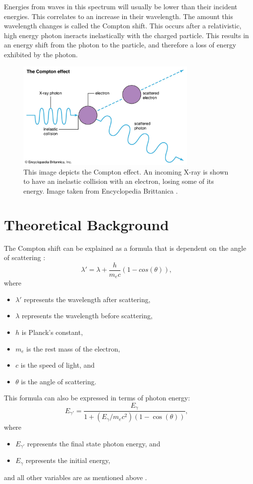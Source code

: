 \documentclass[10pt,letterpaper,onecolumn]{article}
\begin{document}
Energies from waves in this spectrum will usually be lower than their incident energies. This correlates to an increase in their wavelength. The amount this wavelength changes is called the Compton shift. This occurs after a relativistic, high energy photon ineracts inelastically with the charged particle. This results in an energy shift from the photon to the particle, and therefore a loss of energy exhibited by the photon.\cite{Pattison1975}
\begin{figure}
    \begin{center}
        \includegraphics*[width=3.5in]{scattering.jpg}
        \caption{This image depicts the Compton effect. An incoming X-ray is shown to have an inelastic collision with an electron, losing some of its energy. Image taken from Encyclopedia Brittanica \cite{ComptonEffectImage}.}
    \end{center}
\end{figure}
\section{Theoretical Background}
The Compton shift can be explained as a formula that is dependent on the angle of scattering \cite{PhysRev.21.483}:
\begin{equation}
    \label{comptonShiftWavelength} 
    \lambda' = \lambda + \frac{h}{m_e c}(1 - cos(\theta)),
\end{equation}
where 
\begin{itemize}
\item $\lambda'$ represents the wavelength after scattering, 
\item $\lambda$ represents the wavelength before scattering, 
\item $h$ is Planck's constant,
\item $m_e$ is the rest mass of the electron,
\item $c$ is the speed of light, and
\item $\theta$ is the angle of scattering.
\end{itemize}
This formula can also be expressed in terms of photon energy:
\begin{equation}
    \label{comptonShiftEnergy} 
    E_{\gamma'} = \frac{E_{\gamma}}{1 + \left( {E_{\gamma}}/{m_e c^2} \right)(1 - \cos(\theta))},
\end{equation}
where 
\begin{itemize}
\item $ E_{\gamma'}$ represents the final state photon energy, and
\item $E_{\gamma}$ represents the initial energy, 
\end{itemize}
and all other variables are as mentioned above
\cite{Taylor2004ModernPhysics}.
\end{document}
